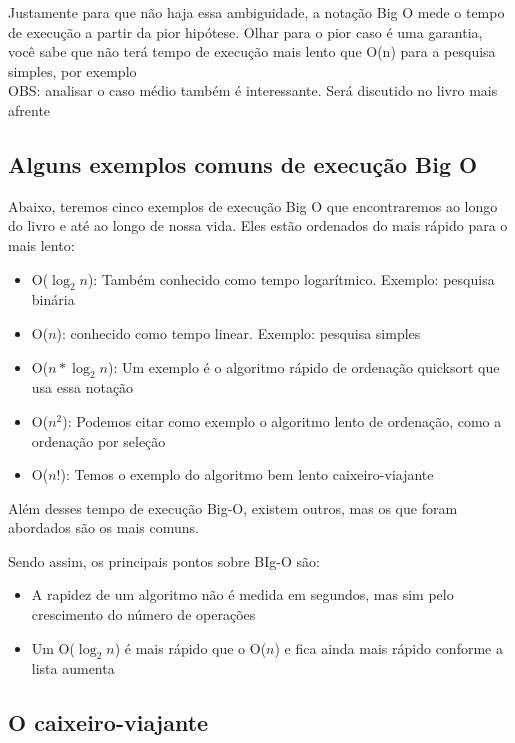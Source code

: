 \documentclass{report}
\begin{document}
	Justamente para que não haja essa ambiguidade, a notação Big O mede o tempo de execução a partir da pior hipótese. Olhar para o pior caso é uma garantia, você sabe que não terá tempo de execução mais lento que O(n) para a pesquisa simples, por exemplo \\
	
	
	OBS: analisar o caso médio também é interessante. Será discutido no livro mais afrente
	
	\subsection{Alguns exemplos comuns de execução Big O}
	
	Abaixo, teremos cinco exemplos de execução Big O que encontraremos ao longo do livro e até ao longo de nossa vida. Eles estão ordenados do mais rápido para o mais lento:
	
	\begin{itemize}
		\item O($\log_{2}n$): Também conhecido como tempo logarítmico. Exemplo: pesquisa binária
		\item O($n$): conhecido como tempo linear. Exemplo: pesquisa simples
		\item O($n * \log_{2}n$): Um exemplo é o algoritmo rápido de ordenação quicksort que usa essa notação
		\item O($n^2$): Podemos citar como exemplo o algoritmo lento de ordenação, como a ordenação por seleção
		\item O($n!$): Temos o exemplo do algoritmo bem lento caixeiro-viajante
	\end{itemize}
	
	Além desses tempo de execução Big-O, existem outros, mas os que foram abordados são os mais comuns.
	
	Sendo assim, os principais pontos sobre BIg-O são:
	
	\begin{itemize}
		\item A rapidez de um algoritmo não é medida em segundos, mas sim pelo crescimento do número de operações
		\item Um O($\log_{2}n$) é mais rápido que o O($n$) e fica ainda mais rápido conforme a lista aumenta
	\end{itemize}
	
	\subsection{O caixeiro-viajante}
	
\end{document}
